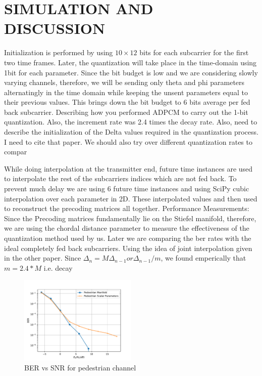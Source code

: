 \documentclass[conference]{IEEEtran}
\begin{document}
\section{SIMULATION AND DISCUSSION}
\label{section3}

Initialization is performed by using $10 \times 12$ bits for each subcarrier for the first two time frames. Later, the quantization will take place in the time-domain using 1bit for each parameter. Since the bit budget is low and we are considering slowly varying channels, therefore, we will be sending only theta and phi parameters alternatingly in the time domain while keeping the unsent parameters equal to their previous values. This brings down the bit budget to 6 bits average per fed back subcarrier. 
Describing how you performed ADPCM to carry out the 1-bit quantization. Also, the increment rate was 2.4 times the decay rate. Also, need to describe the initialization of the Delta values required in the quantization process. I need to cite that paper. We should also try over different quantization rates to compar \cite{Gupt1905}

While doing interpolation at the transmitter end, future time instances are used to interpolate the rest of the subcarriers indices which are not fed back. To prevent much delay we are using 6 future time instances and using SciPy cubic interpolation over each parameter in 2D. These interpolated values and then used to reconstruct the precoding matrices all together.
Performance Measurements:
Since the Precoding matrices fundamentally lie on the Stiefel manifold, therefore, we are using the chordal distance parameter to measure the effectiveness of the quantization method used by us. Later we are comparing the ber rates with the ideal completely fed back subcarriers.
Using the idea of joint interpolation given in the other paper.  
Since $\Delta_{n} = M\Delta_{n-1} or \Delta_{n-1}/m $, we found emperically that $m=2.4*M$ i.e. decay

\begin{figure}
\includegraphics[width=0.5\textwidth]{images/pedestrian.pdf}

\caption{BER vs SNR for pedestrian channel} 
\label{ber_overview}
\vspace{-5pt}
\end{figure}
\end{document}
